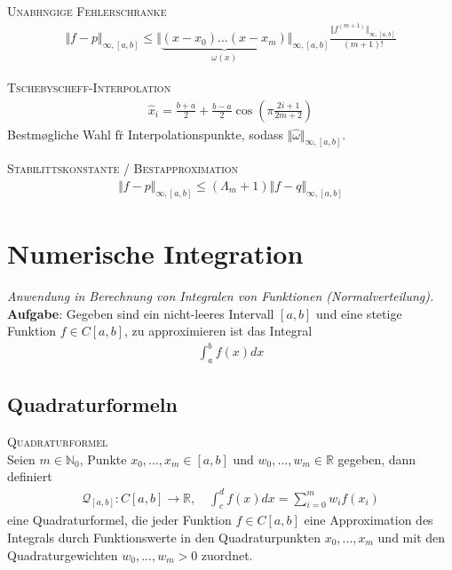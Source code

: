\textsc{Unabh\a ngige Fehlerschranke}\\
\begin{align*}
\Vert f-p \Vert_{\infty,[a,b]} \leq \Vert \underbrace{(x - x_0 )...(x - x_m )}_{\omega(x)} \Vert_{\infty,[a,b]} \frac{\Vert f^{(m+1)} \Vert_{\infty,[a,b]}}{(m+1)!}
\end{align*}

\textsc{Tschebyscheff-Interpolation}\\
\begin{align*}
\hat{x}_i = \frac{b+a}{2} + \frac{b-a}{2} \cos \left( \pi \frac{2i+1}{2m+2}\right)
\end{align*}
Bestm\o gliche Wahl f\u r Interpolationspunkte, sodass $\Vert \hat{\omega}\Vert_{\infty,[a,b]}$.

\textsc{Stabilit\a tskonstante / Bestapproximation}\\
\begin{align*}
\Vert f-p \Vert_{\infty,[a,b]} \leq (\Lambda_m + 1) \Vert f-q \Vert_{\infty,[a,b]} 
\end{align*}

\section{Numerische Integration}
\emph{Anwendung in Berechnung von Integralen von Funktionen (Normalverteilung).}\\

\textbf{Aufgabe}:
Gegeben sind ein nicht-leeres Intervall $[a,b]$ und eine stetige
Funktion $f \in C[a,b]$, zu approximieren ist das Integral
\begin{align*}
\int_a^b f(x) dx
\end{align*}

\subsection{Quadraturformeln}
\textsc{Quadraturformel}\\
Seien $m \in \mathbb{N}_0$, Punkte $x_0, ..., x_m \in [a,b]$ und $w_0, ..., w_m \in \mathbb{R}$ gegeben, dann definiert 
\begin{align*}
\mathcal{Q}_{[a,b]}: C[a,b] \rightarrow \mathbb{R}, \quad \int_c^d f(x) dx = \sum_{i=0}^m w_i f(x_i)
\end{align*}
eine Quadraturformel, die jeder Funktion $f \in C[a,b]$ eine Approximation des Integrals durch Funktionswerte in den Quadraturpunkten $x_0 ,...,x_m$ und mit den Quadraturgewichten $w_0,...,w_m>0$ zuordnet.\vspace{0.2cm}

